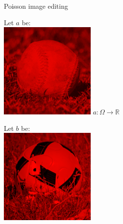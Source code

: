 \documentclass[UKenglish,aspectratio=169]{beamer}
\begin{document}
\begin{frame}{Poisson image editing}
\pause
\begin{minipage}{.12\linewidth}
Let $a$ be:\\
    \includegraphics[width=\linewidth]{../manuscript/img/pie-baseball-red.png}
$a:\Omega\rightarrow \mathbb R$
\end{minipage}
\pause
\quad
\begin{minipage}{.12\linewidth}
Let $b$ be:\\
    \includegraphics[width=\linewidth]{../manuscript/img/pie-football-red.png}

\end{minipage}
\end{frame}
\end{document}
